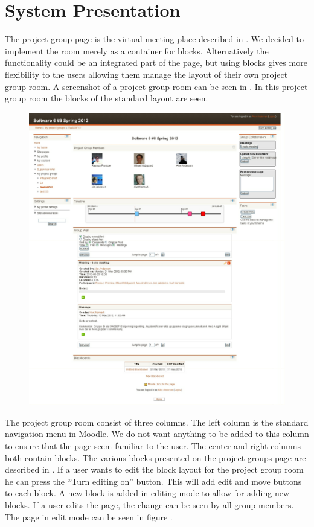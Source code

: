 \chapter{System Presentation}
\label{sub:page}
The project group page is the virtual meeting place described in .
We decided to implement the room merely as a container for blocks. 
Alternatively the functionality could be an integrated part of the page, but using blocks gives more flexibility to the users allowing them manage the layout of their own project group room. 
A screenshot of a project group room can be seen in . 
In this project group room the blocks of the standard layout are seen.
\begin{figure}[h]
	\centering
		\includegraphics[width=\textwidth]{images/projectgroupnoedit.png}
	\label{fig:projectgroupnoedit}
\end{figure}

The project group room consist of three columns. 
The left column is the standard navigation menu in Moodle. 
We do not want anything to be added to this column to ensure that the page seem familiar to the user.
The center and right columns both contain blocks.
The various blocks presented on the project groups page are described in . 
If a user wants to edit the block layout for the project group room he can press the ``Turn editing on'' button. 
This will add edit and move buttons to each block. 
A new block is added in editing mode to allow for adding new blocks. 
If a user edits the page, the change can be seen by all group members. 
The page in edit mode can be seen in figure .

